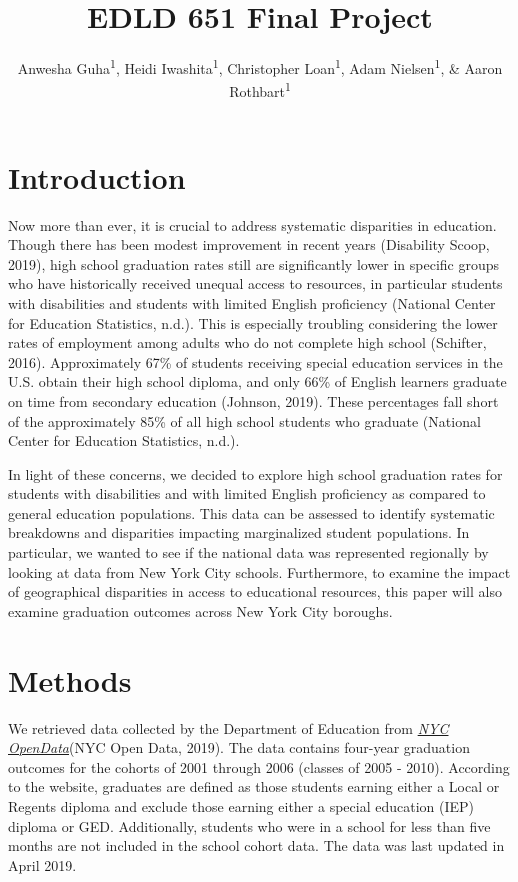 \documentclass[
  english,
  man, fleqn, noextraspace]{apa6}
\title{EDLD 651 Final Project}
\author{Anwesha Guha\textsuperscript{1}, Heidi Iwashita\textsuperscript{1}, Christopher Loan\textsuperscript{1}, Adam Nielsen\textsuperscript{1}, \& Aaron Rothbart\textsuperscript{1}}
\date{}
\affiliation{\vspace{0.5cm}\textsuperscript{1} University of Oregon}
\begin{document}
\maketitle

\hypertarget{introduction}{%
\section{Introduction}\label{introduction}}

Now more than ever, it is crucial to address systematic disparities in education. Though there has been modest improvement in recent years (Disability Scoop, 2019), high school graduation rates still are significantly lower in specific groups who have historically received unequal access to resources, in particular students with disabilities and students with limited English proficiency (National Center for Education Statistics, n.d.). This is especially troubling considering the lower rates of employment among adults who do not complete high school (Schifter, 2016). Approximately 67\% of students receiving special education services in the U.S. obtain their high school diploma, and only 66\% of English learners graduate on time from secondary education (Johnson, 2019). These percentages fall short of the approximately 85\% of all high school students who graduate (National Center for Education Statistics, n.d.).

In light of these concerns, we decided to explore high school graduation rates for students with disabilities and with limited English proficiency as compared to general education populations. This data can be assessed to identify systematic breakdowns and disparities impacting marginalized student populations. In particular, we wanted to see if the national data was represented regionally by looking at data from New York City schools. Furthermore, to examine the impact of geographical disparities in access to educational resources, this paper will also examine graduation outcomes across New York City boroughs.

\hypertarget{methods}{%
\section{Methods}\label{methods}}

We retrieved data collected by the Department of Education from \href{https://data.cityofnewyork.us/Education/2005-2010-Graduation-Outcomes-By-Borough/avir-tzek}{\emph{NYC OpenData}}(NYC Open Data, 2019). The data contains four-year graduation outcomes for the cohorts of 2001 through 2006 (classes of 2005 - 2010). According to the website, graduates are defined as those students earning either a Local or Regents diploma and exclude those earning either a special education (IEP) diploma or GED. Additionally, students who were in a school for less than five months are not included in the school cohort data. The data was last updated in April 2019.
\end{document}
